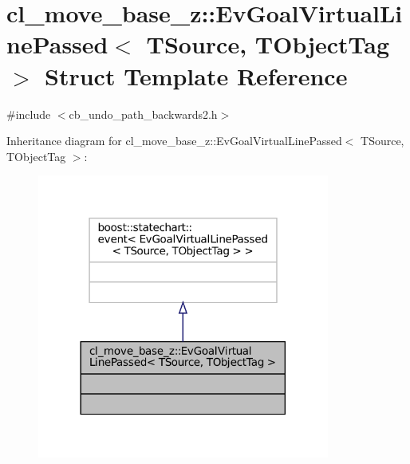 \hypertarget{structcl__move__base__z_1_1EvGoalVirtualLinePassed}{}\section{cl\+\_\+move\+\_\+base\+\_\+z\+:\+:Ev\+Goal\+Virtual\+Line\+Passed$<$ T\+Source, T\+Object\+Tag $>$ Struct Template Reference}
\label{structcl__move__base__z_1_1EvGoalVirtualLinePassed}


{\ttfamily \#include $<$cb\+\_\+undo\+\_\+path\+\_\+backwards2.\+h$>$}



Inheritance diagram for cl\+\_\+move\+\_\+base\+\_\+z\+:\+:Ev\+Goal\+Virtual\+Line\+Passed$<$ T\+Source, T\+Object\+Tag $>$\+:
\nopagebreak
\begin{figure}[H]
\begin{center}
\leavevmode
\includegraphics[width=272pt]{structcl__move__base__z_1_1EvGoalVirtualLinePassed__inherit__graph}
\end{center}
\end{figure}


